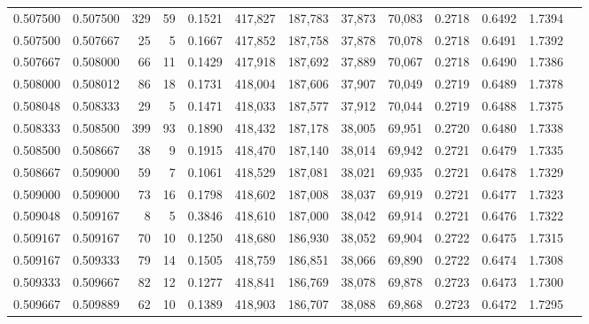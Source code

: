 \begin{tabular}{rrrrrrrrrrrrr}
0.507500 & 0.507500 &   329 &  59 &                                     0.1521 & 417,827 & 187,783 &  37,873 &  70,083 & 0.2718 & 0.6492 & 1.7394 \\
0.507500 & 0.507667 &    25 &   5 &                                     0.1667 & 417,852 & 187,758 &  37,878 &  70,078 & 0.2718 & 0.6491 & 1.7392 \\
0.507667 & 0.508000 &    66 &  11 &                                     0.1429 & 417,918 & 187,692 &  37,889 &  70,067 & 0.2718 & 0.6490 & 1.7386 \\
0.508000 & 0.508012 &    86 &  18 &                                     0.1731 & 418,004 & 187,606 &  37,907 &  70,049 & 0.2719 & 0.6489 & 1.7378 \\
0.508048 & 0.508333 &    29 &   5 &                                     0.1471 & 418,033 & 187,577 &  37,912 &  70,044 & 0.2719 & 0.6488 & 1.7375 \\
0.508333 & 0.508500 &   399 &  93 &                                     0.1890 & 418,432 & 187,178 &  38,005 &  69,951 & 0.2720 & 0.6480 & 1.7338 \\
0.508500 & 0.508667 &    38 &   9 &                                     0.1915 & 418,470 & 187,140 &  38,014 &  69,942 & 0.2721 & 0.6479 & 1.7335 \\
0.508667 & 0.509000 &    59 &   7 &                                     0.1061 & 418,529 & 187,081 &  38,021 &  69,935 & 0.2721 & 0.6478 & 1.7329 \\
0.509000 & 0.509000 &    73 &  16 &                                     0.1798 & 418,602 & 187,008 &  38,037 &  69,919 & 0.2721 & 0.6477 & 1.7323 \\
0.509048 & 0.509167 &     8 &   5 &                                     0.3846 & 418,610 & 187,000 &  38,042 &  69,914 & 0.2721 & 0.6476 & 1.7322 \\
0.509167 & 0.509167 &    70 &  10 &                                     0.1250 & 418,680 & 186,930 &  38,052 &  69,904 & 0.2722 & 0.6475 & 1.7315 \\
0.509167 & 0.509333 &    79 &  14 &                                     0.1505 & 418,759 & 186,851 &  38,066 &  69,890 & 0.2722 & 0.6474 & 1.7308 \\
0.509333 & 0.509667 &    82 &  12 &                                     0.1277 & 418,841 & 186,769 &  38,078 &  69,878 & 0.2723 & 0.6473 & 1.7300 \\
0.509667 & 0.509889 &    62 &  10 &                                     0.1389 & 418,903 & 186,707 &  38,088 &  69,868 & 0.2723 & 0.6472 & 1.7295 \\

\end{tabular}
